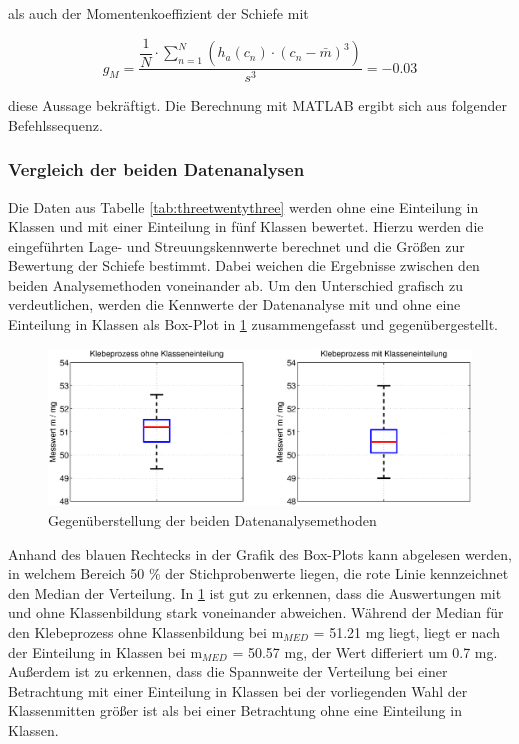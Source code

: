 \noindent als auch der Momentenkoeffizient der Schiefe mit

\begin{equation}\label{eq:threeeightythree}
g_{M} =\dfrac{\dfrac{1}{N} \cdot \sum _{n=1}^{N}(h_{a} (c_{n} )\cdot (c_{n} -\bar{m})^{3}) }{s^{3} } =-0.03
\end{equation}

\noindent diese Aussage bekr\"{a}ftigt. Die Berechnung mit MATLAB ergibt sich aus folgender Befehlssequenz.



\subsubsection{Vergleich der beiden Datenanalysen}

\noindent Die Daten aus Tabelle \ref{tab:threetwentythree} werden ohne eine Einteilung in Klassen und mit einer Einteilung in f\"{u}nf Klassen bewertet. Hierzu werden die eingef\"{u}hrten Lage- und Streuungskennwerte berechnet und die Gr\"{o}{\ss}en zur Bewertung der Schiefe bestimmt. Dabei weichen die Ergebnisse zwischen den beiden Analysemethoden voneinander ab. Um den Unterschied grafisch zu verdeutlichen, werden die Kennwerte der Datenanalyse mit und ohne eine Einteilung in Klassen als Box-Plot in \ref{fig:DefinitionSchiefeBoxPlot3} zusammengefasst und gegen\"{u}bergestellt.

\noindent 
\begin{figure}[H]
  \centerline{\includegraphics[width=1\textwidth]{Kapitel3/Bilder/image16}}
  \caption{Gegen\"{u}berstellung der beiden Datenanalysemethoden}
  \label{fig:DefinitionSchiefeBoxPlot3}
\end{figure}

\noindent Anhand des blauen Rechtecks in der Grafik des Box-Plots kann abgelesen werden, in welchem Bereich 50 \% der Stichprobenwerte liegen, die rote Linie kennzeichnet den Median der Verteilung. In \ref{fig:DefinitionSchiefeBoxPlot3} ist gut zu erkennen, dass die Auswertungen mit und ohne Klassenbildung stark voneinander abweichen. W\"{a}hrend der Median f\"{u}r den Klebeprozess ohne Klassenbildung bei m$_{MED}$ = 51.21 mg liegt, liegt er nach der Einteilung in Klassen bei m$_{MED}$ = 50.57 mg, der Wert differiert um 0.7 mg. Au{\ss}erdem ist zu erkennen, dass die Spannweite der Verteilung bei einer Betrachtung mit einer Einteilung in Klassen bei der vorliegenden Wahl der Klassenmitten gr\"{o}{\ss}er ist als bei einer Betrachtung ohne eine Einteilung in Klassen.\newline

